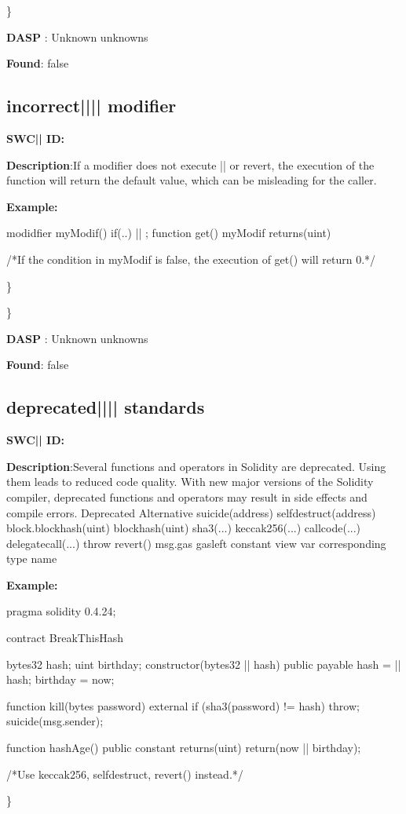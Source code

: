 \documentclass{article}
\begin{document}
\} 

\textbf{DASP} : Unknown unknowns

\textbf{Found}: false

\subsection{incorrect{||\textunderscore|| }modifier} 
\textbf{SWC{|\textunderscore| }ID:} 

\textbf{Description}:If a modifier does not execute |\textunderscore|  or revert, the execution of the function will return the default value, which can be misleading for the caller.


\textbf{Example:} 
\begin{ffcode} 

modidfier myModif(){
    if(..){
      |\textunderscore| ;
    }
}
function get() myModif returns(uint){}

 /*If the condition in myModif is false, the execution of get() will return 0.*/ 

\end{ffcode} 
\} 

\} 

\textbf{DASP} : Unknown unknowns

\textbf{Found}: false

\subsection{deprecated{||\textunderscore|| }standards} 
\textbf{SWC{|\textunderscore| }ID:} 

\textbf{Description}:Several functions and operators in Solidity are deprecated. Using them leads to reduced code quality. With new major versions of the Solidity compiler, deprecated functions and operators may result in side effects and compile errors.
  Deprecated              Alternative
  suicide(address)        selfdestruct(address)
  block.blockhash(uint)   blockhash(uint)
  sha3(...)               keccak256(...)
  callcode(...)           delegatecall(...)
  throw                   revert()
  msg.gas                 gasleft
  constant                view
  var                     corresponding type name


\textbf{Example:} 
\begin{ffcode} 

pragma solidity 0.4.24;

contract BreakThisHash {
    bytes32 hash;
    uint birthday;
    constructor(bytes32 |\textunderscore| hash) public payable {
        hash = |\textunderscore| hash;
        birthday = now;
    }

    function kill(bytes password) external {
        if (sha3(password) != hash) {
            throw;
        }
        suicide(msg.sender);
    }

    function hashAge() public constant returns(uint) {
        return(now |\textendash|  birthday);
    }
}

 /*Use keccak256, selfdestruct, revert() instead.*/ 

\end{ffcode} 
\} 
\end{document}
